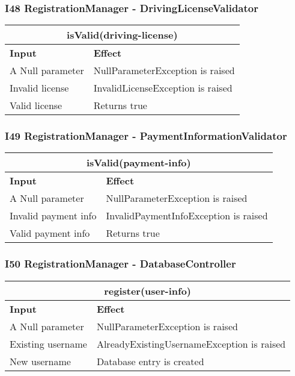 \subsubsection{I48 RegistrationManager - DrivingLicenseValidator}
\begin{tabular}{|p{5cm}|p{7cm}|}
\hline
\multicolumn{2}{|c|}{isValid(driving-license)} \\
\hline
\textbf{Input} & \textbf{Effect} \\

\hline
A Null parameter & NullParameterException is raised \\

\hline
Invalid license & InvalidLicenseException is raised \\

\hline
Valid license & Returns true \\
\hline
\end{tabular}

\subsubsection{I49 RegistrationManager - PaymentInformationValidator}
\begin{tabular}{|p{5cm}|p{7cm}|}
\hline
\multicolumn{2}{|c|}{isValid(payment-info)} \\
\hline
\textbf{Input} & \textbf{Effect} \\

\hline
A Null parameter & NullParameterException is raised \\

\hline
Invalid payment info & InvalidPaymentInfoException is raised \\

\hline
Valid payment info & Returns true \\
\hline
\end{tabular}

\subsubsection{I50 RegistrationManager - DatabaseController}
\begin{tabular}{|p{5cm}|p{7cm}|}
\hline
\multicolumn{2}{|c|}{register(user-info)} \\
\hline
\textbf{Input} & \textbf{Effect} \\

\hline
A Null parameter & NullParameterException is raised \\

\hline
Existing username & AlreadyExistingUsernameException is raised \\

\hline
New username & Database entry is created \\
\hline
\end{tabular}
